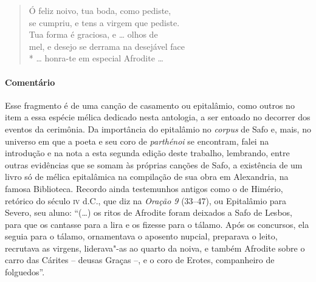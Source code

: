 \begin{verse}
Ó feliz noivo, tua boda, como pediste,\\
se cumpriu, e tens a virgem que pediste.\\
Tua forma é graciosa, e \ldots{} olhos de\\
mel, e desejo se derrama na desejável face\\*
\ldots{} honra-te em especial Afrodite \ldots{}
\end{verse}

\paragraph{Comentário} Esse fragmento é de uma canção de casamento ou epitalâmio, como outros no item a essa espécie mélica dedicado nesta antologia, a ser entoado no decorrer dos eventos da cerimônia.
Da importância do epitalâmio no \textit{corpus} de Safo e, mais, no universo em que a poeta e seu coro de \textit{parthénoi} se encontram, falei na introdução e na nota a esta segunda edição deste trabalho, lembrando, entre outras evidências que se somam às próprias canções de Safo, a existência de um livro só de mélica epitalâmica na compilação de sua obra  em Alexandria, na famosa Biblioteca. Recordo ainda testemunhos antigos como o de Himério, retórico do século \textsc{iv} d.C., que diz na \textit{Oração 9} (33--47), ou Epitalâmio para Severo, seu aluno: ``(\ldots{}) os ritos de Afrodite foram deixados a Safo de Lesbos, para que os cantasse para a lira e os fizesse para o tálamo. Após os concursos, ela seguia para o tálamo, ornamentava o aposento nupcial, preparava o leito, recrutava as virgens, liderava"-as ao quarto da noiva, e também Afrodite sobre o carro das Cárites -- deusas Graças --, e o coro de Erotes, companheiro de folguedos''.

